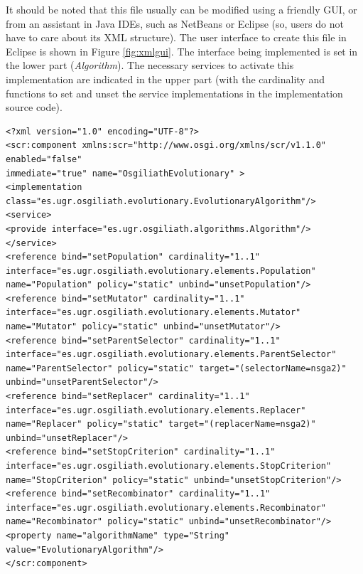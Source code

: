 It should be noted that this file usually can be modified using a friendly GUI, or from an assistant in Java IDEs, such as NetBeans or Eclipse (so, users do not have to care about its XML structure). The user interface to create this file in Eclipse is shown in Figure \ref{fig:xmlgui}. The interface being implemented is set in the lower part ({\em Algorithm}). The necessary services to activate this implementation are indicated in the upper part (with the cardinality and functions to set and unset the service implementations in the implementation source code).

\newsavebox{\mintedboxDS}
\begin{lrbox}{\mintedboxDS}
\begin{minipage}{10cm}
\begin{verbatim}
<?xml version="1.0" encoding="UTF-8"?>
<scr:component xmlns:scr="http://www.osgi.org/xmlns/scr/v1.1.0" enabled="false"
immediate="true" name="OsgiliathEvolutionary" >
<implementation class="es.ugr.osgiliath.evolutionary.EvolutionaryAlgorithm"/>
<service>
<provide interface="es.ugr.osgiliath.algorithms.Algorithm"/>
</service>
<reference bind="setPopulation" cardinality="1..1"
interface="es.ugr.osgiliath.evolutionary.elements.Population"
name="Population" policy="static" unbind="unsetPopulation"/>
<reference bind="setMutator" cardinality="1..1"
interface="es.ugr.osgiliath.evolutionary.elements.Mutator"
name="Mutator" policy="static" unbind="unsetMutator"/>
<reference bind="setParentSelector" cardinality="1..1"
interface="es.ugr.osgiliath.evolutionary.elements.ParentSelector"
name="ParentSelector" policy="static" target="(selectorName=nsga2)" 
unbind="unsetParentSelector"/>
<reference bind="setReplacer" cardinality="1..1"
interface="es.ugr.osgiliath.evolutionary.elements.Replacer"
name="Replacer" policy="static" target="(replacerName=nsga2)" 
unbind="unsetReplacer"/>
<reference bind="setStopCriterion" cardinality="1..1"
interface="es.ugr.osgiliath.evolutionary.elements.StopCriterion"
name="StopCriterion" policy="static" unbind="unsetStopCriterion"/>
<reference bind="setRecombinator" cardinality="1..1"
interface="es.ugr.osgiliath.evolutionary.elements.Recombinator"
name="Recombinator" policy="static" unbind="unsetRecombinator"/>
<property name="algorithmName" type="String" value="EvolutionaryAlgorithm"/>
</scr:component>
\end{verbatim}
\end{minipage}
\end{lrbox} %

